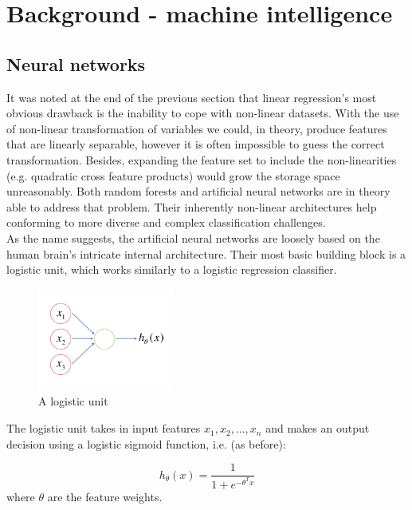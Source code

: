 \documentclass[a4paper, 11pt]{article}
\numberwithin{equation}{section}
\begin{document}
	\section{Background - machine intelligence}
	
	\subsection{Neural networks}
	
	\cite{ng2015coursera} It was noted at the end of the previous section that linear regression's most obvious drawback is the inability to cope with non-linear datasets. With the use of non-linear transformation of variables we could, in theory, produce features that are linearly separable, however it is often impossible to guess the correct transformation. Besides, expanding the feature set to include the non-linearities (e.g. quadratic cross feature products) would grow the storage space unreasonably. Both random forests and artificial neural networks are in theory able to address that problem. Their inherently non-linear architectures help conforming to more diverse and complex classification challenges. \\
	
	As the name suggests, the artificial neural networks are loosely based on the human brain's intricate internal architecture. Their most basic building block is a logistic unit, which works similarly to a logistic regression classifier.
	
	\begin{figure}[!h]
		\centering
		\includegraphics[page=1,width=0.40\textwidth]{logistic_unit.pdf}
		\caption{\label{fig:logistic_unit}{A logistic unit}}
	\end{figure}
	
	The logistic unit takes in input features $x_1, x_2, ..., x_n$ and makes an output decision using a logistic sigmoid function, i.e. (as before):
	
	\begin{equation}
	h_\theta (x) = \frac{1}{1+e^{-\theta ^ T x}}
	\end{equation}
	where $\theta$ are the feature weights.\\
	
\end{document}
